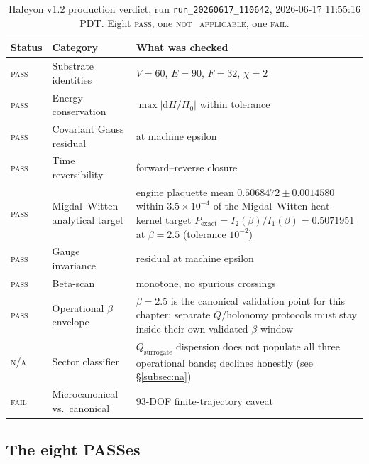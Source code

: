 \documentclass[12pt,a4paper]{article}
\theoremstyle{plain}
\theoremstyle{definition}
\theoremstyle{remark}
\begin{document}
\begin{table}[h]
\centering
\begin{tabular}{llp{7.2cm}}
\toprule
\textbf{Status} & \textbf{Category} & \textbf{What was checked} \\
\midrule
\textsc{pass} & Substrate identities & $V=60$, $E=90$, $F=32$, $\chi=2$ \\
\textsc{pass} & Energy conservation & $\max |\mathrm{d}H/H_0|$ within tolerance \\
\textsc{pass} & Covariant Gauss residual & at machine epsilon \\
\textsc{pass} & Time reversibility & forward--reverse closure \\
\textsc{pass} & Migdal--Witten analytical target & engine plaquette mean $0.5068472 \pm 0.0014580$ within $3.5\times 10^{-4}$ of the Migdal--Witten heat-kernel target $P_{\mathrm{exact}} = I_2(\beta)/I_1(\beta) = 0.5071951$ at $\beta=2.5$ (tolerance $10^{-2}$) \\
\textsc{pass} & Gauge invariance & residual at machine epsilon \\
\textsc{pass} & Beta-scan & monotone, no spurious crossings \\
\textsc{pass} & Operational $\beta$ envelope & $\beta = 2.5$ is the canonical validation point for this chapter; separate $Q$/holonomy protocols must stay inside their own validated $\beta$-window \\
\midrule
\textsc{n/a} & Sector classifier & $Q_{\mathrm{surrogate}}$ dispersion does not populate all three operational bands; declines honestly (see \S\ref{subsec:na}) \\
\midrule
\textsc{fail} & Microcanonical vs.\ canonical & 93-DOF finite-trajectory caveat \\
\bottomrule
\end{tabular}
\caption{Halcyon v1.2 production verdict, run \texttt{run\_20260617\_110642}, 2026-06-17 11:55:16 PDT. Eight \textsc{pass}, one \textsc{not\_applicable}, one \textsc{fail}.}
\label{tab:verdict}
\end{table}

\subsection{The eight PASSes}
\end{document}
